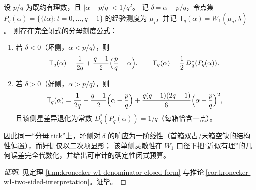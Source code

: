 \begin{conclusion}\label{con:xi-terminal-kronecker-w1-denominator-one-sided-sensitivity}
设 \(p/q\) 为既约有理数，且 \(|\alpha-p/q|<1/q^2\)。
记 \(\delta=\alpha-p/q\)，令点集 \(P_q(\alpha)=\{\{t\alpha\}:t=0,\dots,q-1\}\) 的经验测度为 \(\mu_q\)，并记
\(
\mathsf{T}_q(\alpha)=W_1(\mu_q,\lambda)
\)。
则存在完全闭式的分母刻度公式：
\begin{enumerate}
  \item 若 \(\delta<0\)（坏侧，\(\alpha<p/q\)），则
  \[
  \mathsf{T}_q(\alpha)=\frac{1}{2q}+\frac{q-1}{2}\Bigl(\frac{p}{q}-\alpha\Bigr),
  \qquad
  \mathsf{T}_q(\alpha)=\frac12\,D_q^\ast(P_q(\alpha)).
  \]
  \item 若 \(\delta>0\)（好侧，\(\alpha>p/q\)），则
  \[
  \mathsf{T}_q(\alpha)=\frac{1}{2q}-\frac{q-1}{2}\Bigl(\alpha-\frac{p}{q}\Bigr)
  +\frac{q(q-1)(2q-1)}{6}\Bigl(\alpha-\frac{p}{q}\Bigr)^2,
  \]
  且该侧星差异退化为常数 \(D_q^\ast(P_q(\alpha))=1/q\)（每箱恰含一点）。
\end{enumerate}
因此同一“分母 tick”上，坏侧对 \(\delta\) 的响应为一阶线性（首箱双占/末箱空缺的结构性偏置），而好侧仅以二次项显影；
该单侧灵敏性在 \(W_1\) 口径下把“近似有理”的几何误差完全代数化，并给出可审计的确定性闭式预算。
\end{conclusion}
\begin{proof}[证明]
见定理 \ref{thm:kronecker-w1-denominator-closed-form} 与推论 \ref{cor:kronecker-w1-two-sided-interpretation}。证毕。
\end{proof}
